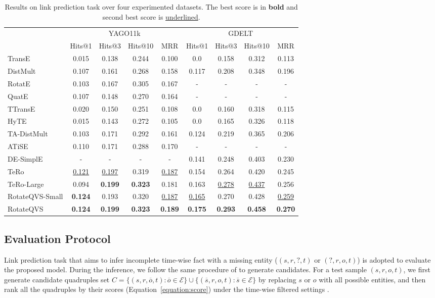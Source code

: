 \documentclass[11pt]{article}
\begin{document}
\begin{table*}[!t]
\begin{tabular}{@{}lcccc|cccc@{}}
\midrule
   & \multicolumn{4}{c|}{YAGO11k}   & \multicolumn{4}{c}{GDELT} \\
\cmidrule{2-9}
   &  Hits@1        & Hits@3  & Hits@10  & MRR & Hits@1        & Hits@3  & Hits@10  & MRR \\
\midrule
TransE      & 0.015 & 0.138 & 0.244 &0.100  & 0.0   & 0.158 & 0.312 & 0.113  \\
DistMult   & 0.107 & 0.161 & 0.268 & 0.158  & 0.117 & 0.208 & 0.348  & 0.196 \\
RotatE       &  0.103  & 0.167 & 0.305 & 0.167         &-    & - & - & -\\
QuatE      &  0.107  & 0.148 & 0.270 & 0.164 &-    & - & - & -\\
\midrule
TTransE   & 0.020 & 0.150 & 0.251 & 0.108 & 0.0           & 0.160 & 0.318 & 0.115\\
HyTE       &  0.015  & 0.143 & 0.272 & 0.105 
& 0.0           & 0.165 & 0.326 & 0.118 \\
TA-DistMult  & 0.103 &0.171 &0.292 & 0.161 & 0.124          & 0.219 & 0.365 & 0.206 \\
ATiSE      & 0.110  & 0.171 & 0.288 & 0.170 &-    & - & - & -\\
DE-SimplE  & -  & -& - & - &  0.141 &0.248 & 0.403 & 0.230  \\
\midrule
TeRo       & \underline{0.121} &\underline{0.197} &0.319 &\underline{0.187} & 0.154   & 0.264  & 0.420  & 0.245  \\
TeRo-Large       & 0.094 & \bfseries 0.199 & \bfseries 0.323 & 0.181 &  0.163          & \underline{0.278} & \underline{0.437} & 0.256 \\
\midrule
RotateQVS-Small & \bfseries 0.124       & 0.193 & 0.320 & \underline{0.187} & \underline{0.165}        & 0.270 & 0.428 & \underline{0.259}\\
RotateQVS & \bfseries 0.124 & \bfseries 0.199 & \bfseries 0.323 & \bfseries0.189 &\bfseries  0.175    &\bfseries 0.293 &\bfseries 0.458 &\bfseries 0.270\\
\bottomrule
\end{tabular}
 \caption{Results on link prediction task over four experimented datasets. The best score is in \textbf{bold} and second best score is \underline{underlined}. 
}
\label{table:results}
\end{table*}

\subsection{Evaluation Protocol}
Link prediction task that aims to infer incomplete time-wise fact with a missing entity ($(s, r, ? , t)$ or $(?, r, o , t)$) is adopted to evaluate the proposed model.
During the inference, we follow the same procedure of \citeauthor{xu2020tero} to generate candidates. For a test sample $(s, r, o , t)$, we first generate candidate quadruples set $C = \{(s, r, \overline{o}, t) : \overline{o} \in \mathcal{E}\} \cup \{(\overline{s}, r, o, t) : \overline{s} \in \mathcal{E}\}$ by replacing $s$ or $o$ with all possible entities, and then rank all the quadruples by their scores (Equation~\ref{equation:score}) under the time-wise filtered settings \cite{xu2019temporal,goel2020diachronic}.
\end{document}

